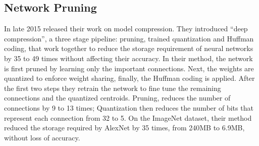 \documentclass{article} \usepackage{lets_keepit_simple,times}
\begin{document}
\subsection{Network Pruning} 
In late 2015 \cite{Han_deep_compression_2015} released their work on model compression. They introduced “deep compression”, a three stage pipeline: pruning, trained quantization and Huffman coding, that work together to reduce the storage requirement of neural networks by 35 to 49 times without affecting their accuracy. In their method, the network is first pruned by learning only the important connections. Next, the weights are quantized to enforce weight sharing, finally, the Huffman coding is applied. After the first two steps they retrain the network to fine tune the remaining connections and the quantized centroids. Pruning, reduces the number of connections by 9 to 13 times; Quantization then reduces the number of bits that represent each connection from 32 to 5. On the ImageNet dataset, their method reduced the storage required by AlexNet by 35 times, from 240MB to 6.9MB, without loss of accuracy.
\end{document}
